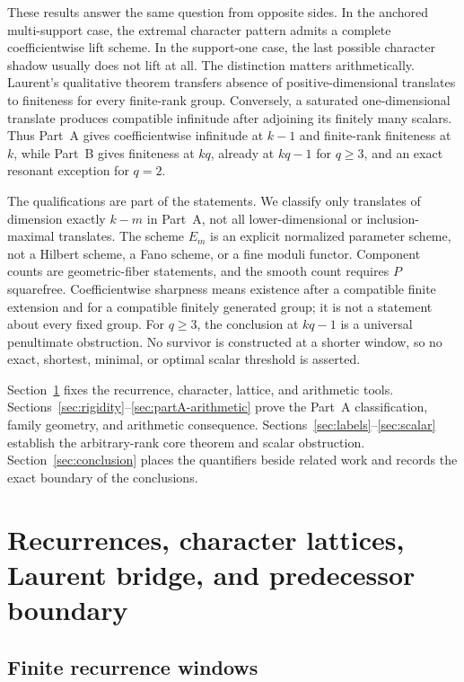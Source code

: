 \documentclass[11pt]{article}
\theoremstyle{remark}
\numberwithin{equation}{section}
\begin{document}
These results answer the same question from opposite sides.  In the anchored multi-support case, the extremal character pattern admits a complete coefficientwise lift scheme.  In the support-one case, the last possible character shadow usually does not lift at all.  The distinction matters arithmetically.  Laurent's qualitative theorem \citep{laurent1984equations} transfers absence of positive-dimensional translates to finiteness for every finite-rank group.  Conversely, a saturated one-dimensional translate produces compatible infinitude after adjoining its finitely many scalars.  Thus Part~A gives coefficientwise infinitude at \(k-1\) and finite-rank finiteness at \(k\), while Part~B gives finiteness at \(kq\), already at \(kq-1\) for \(q\geq3\), and an exact resonant exception for \(q=2\).

The qualifications are part of the statements.  We classify only translates of dimension exactly \(k-m\) in Part~A, not all lower-dimensional or inclusion-maximal translates.  The scheme \(E_m\) is an explicit normalized parameter scheme, not a Hilbert scheme, a Fano scheme, or a fine moduli functor.  Component counts are geometric-fiber statements, and the smooth count requires \(P\) squarefree.  Coefficientwise sharpness means existence after a compatible finite extension and for a compatible finitely generated group; it is not a statement about every fixed group.  For \(q\geq3\), the conclusion at \(kq-1\) is a universal penultimate obstruction.  No survivor is constructed at a shorter window, so no exact, shortest, minimal, or optimal scalar threshold is asserted.

Section~\ref{sec:preliminaries} fixes the recurrence, character, lattice, and arithmetic tools.  Sections~\ref{sec:rigidity}--\ref{sec:partA-arithmetic} prove the Part~A classification, family geometry, and arithmetic consequence.  Sections~\ref{sec:labels}--\ref{sec:scalar} establish the arbitrary-rank core theorem and scalar obstruction.  Section~\ref{sec:conclusion} places the quantifiers beside related work and records the exact boundary of the conclusions.

\section{Recurrences, character lattices, Laurent bridge, and predecessor boundary}\label{sec:preliminaries}

\subsection{Finite recurrence windows}
\end{document}
